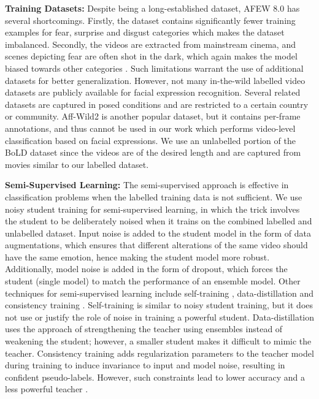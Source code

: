 \documentclass[runningheads]{llncs}
\begin{document}
\noindent\textbf{Training Datasets:} Despite being a long-established dataset, AFEW 8.0 \cite{dhall2012collecting} has several shortcomings. Firstly, the dataset contains significantly fewer training examples for fear, surprise and disgust categories which makes the dataset imbalanced. Secondly, the videos are extracted from mainstream cinema, and scenes depicting fear are often shot in the dark, which again makes the model biased towards other categories  \cite{lu2018multiple,acharya2018covariance}. Such limitations warrant the use of additional datasets for better generalization. However, not many in-the-wild labelled video datasets are publicly available for facial expression recognition. Several related datasets \cite{lucey2010extended,valstar2010induced,lyons1998japanese} are captured in posed conditions and are restricted to a certain country or community. Aff-Wild2 \cite{kollias2018aff} is another popular dataset, but it contains per-frame annotations, and thus cannot be used in our work which performs video-level classification based on facial expressions. We use an unlabelled portion of the BoLD dataset \cite{luo2020arbee} since the videos are of the desired length and are captured from movies similar to our labelled dataset. 

\noindent\textbf{Semi-Supervised Learning:} The semi-supervised approach is effective in classification problems when the labelled training data is not sufficient. We use noisy student training \cite{xie2019self} for semi-supervised learning, in which the trick involves the student to be deliberately noised when it trains on the combined labelled and unlabelled dataset. Input noise is added to the student model in the form of data augmentations, which ensures that different alterations of the same video should have the same emotion, hence making the student model more robust. Additionally, model noise is added in the form of dropout, which forces the student (single model) to match the performance of an ensemble model. Other techniques for semi-supervised learning include self-training \cite{yarowsky1995unsupervised,riloff1996automatically}, data-distillation \cite{radosavovic2018data} and consistency training \cite{bachman2014learning,rasmus2015semi}. Self-training is similar to noisy student training, but it does not use or justify the role of noise in training a powerful student. Data-distillation uses the approach of strengthening the teacher using ensembles instead of weakening the student; however, a smaller student makes it difficult to mimic the teacher. Consistency training adds regularization parameters to the teacher model during training to induce invariance to input and model noise, resulting in confident pseudo-labels. However, such constraints lead to lower accuracy and a less powerful teacher \cite{xie2019self}.
\end{document}
